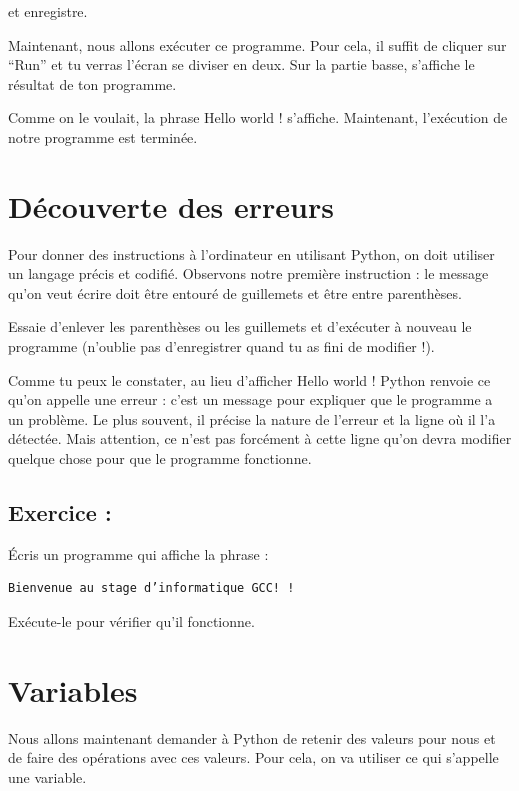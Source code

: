 \documentclass[a4paper,french,11pt]{article}
\begin{document}
et enregistre.

Maintenant, nous allons exécuter ce programme. Pour cela, il suffit de
cliquer sur ``Run'' et tu verras l'écran se diviser en deux. Sur la
partie basse, s'affiche le résultat de ton programme.

Comme on le voulait, la phrase Hello world ! s'affiche. Maintenant,
l'exécution de notre programme est terminée.

\hypertarget{duxe9couverte-des-erreurs}{%
\section{Découverte des erreurs}\label{duxe9couverte-des-erreurs}}

Pour donner des instructions à l'ordinateur en utilisant Python, on doit
utiliser un langage précis et codifié. Observons notre première
instruction : le message qu'on veut écrire doit être entouré de
guillemets et être entre parenthèses.

Essaie d'enlever les parenthèses ou les guillemets et d'exécuter à
nouveau le programme (n'oublie pas d'enregistrer quand tu as fini de
modifier !).

Comme tu peux le constater, au lieu d'afficher Hello world ! Python
renvoie ce qu'on appelle une erreur : c'est un message pour expliquer
que le programme a un problème. Le plus souvent, il précise la nature de
l'erreur et la ligne où il l'a détectée. Mais attention, ce n'est pas
forcément à cette ligne qu'on devra modifier quelque chose pour que le
programme fonctionne.

\hypertarget{exercice}{%
\subsection{Exercice :}\label{exercice}}

Écris un programme qui affiche la phrase :

\begin{verbatim}
Bienvenue au stage d’informatique GCC! !
\end{verbatim}

Exécute-le pour vérifier qu'il fonctionne.

\hypertarget{variables}{%
\section{Variables}\label{variables}}

Nous allons maintenant demander à Python de retenir des valeurs pour
nous et de faire des opérations avec ces valeurs. Pour cela, on va
utiliser ce qui s'appelle une variable.
\end{document}
